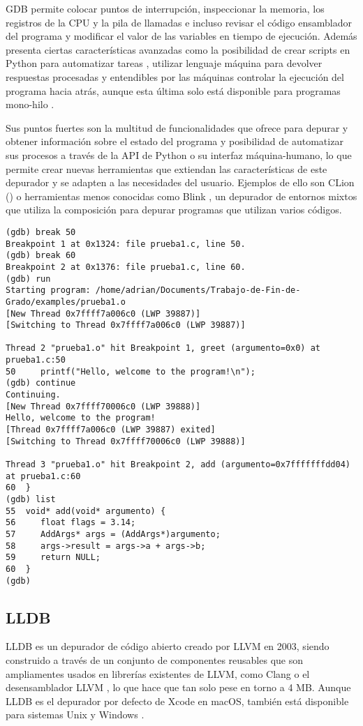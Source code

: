 GDB permite colocar puntos de interrupción, inspeccionar la memoria, los \gls{registros} de la \gls{CPU} y la pila de llamadas e incluso revisar el código \gls{ensamblador} del programa y modificar el valor de las variables en tiempo de ejecución. Además presenta ciertas características avanzadas como la posibilidad de crear \glspl{script} en Python para automatizar tareas \cite{GDBPython}, utilizar \gls{lenguaje máquina} para devolver respuestas procesadas y entendibles por las máquinas \cite{GDB/MI} controlar la ejecución del programa hacia atrás, aunque esta última solo está disponible para programas mono-hilo \cite{GDBReversing}.

Sus puntos fuertes son la multitud de funcionalidades que ofrece para \gls{depurar} y obtener información sobre el estado del programa y posibilidad de automatizar sus \glspl{proceso} a través de la \gls{API} de Python o su \gls{interfaz máquina-humano}, lo que permite crear nuevas herramientas que extiendan las características de este \gls{depurador} y se adapten a las necesidades del usuario. Ejemplos de ello son CLion () o herramientas menos conocidas como Blink \cite{Blink}, un \gls{depurador} de entornos mixtos que utiliza la composición para \gls{depurar} programas que utilizan varios códigos.

\begin{lstlisting}[caption={Muestra del depurador GDB}]
(gdb) break 50
Breakpoint 1 at 0x1324: file prueba1.c, line 50.
(gdb) break 60
Breakpoint 2 at 0x1376: file prueba1.c, line 60.
(gdb) run
Starting program: /home/adrian/Documents/Trabajo-de-Fin-de-Grado/examples/prueba1.o 
[New Thread 0x7ffff7a006c0 (LWP 39887)]
[Switching to Thread 0x7ffff7a006c0 (LWP 39887)]

Thread 2 "prueba1.o" hit Breakpoint 1, greet (argumento=0x0) at prueba1.c:50
50	   printf("Hello, welcome to the program!\n");
(gdb) continue
Continuing.
[New Thread 0x7ffff70006c0 (LWP 39888)]
Hello, welcome to the program!
[Thread 0x7ffff7a006c0 (LWP 39887) exited]
[Switching to Thread 0x7ffff70006c0 (LWP 39888)]

Thread 3 "prueba1.o" hit Breakpoint 2, add (argumento=0x7fffffffdd04) at prueba1.c:60
60	}
(gdb) list
55	void* add(void* argumento) {
56	   float flags = 3.14;
57	   AddArgs* args = (AddArgs*)argumento;
58	   args->result = args->a + args->b;
59	   return NULL;
60	}
(gdb) 
\end{lstlisting}

\subsection{LLDB}{\label{subsec:lldb}}
LLDB es un \gls{depurador} de \gls{código abierto} creado por LLVM en 2003, siendo construido a través de un conjunto de componentes reusables que son ampliamentes usados en librerías existentes de LLVM, como Clang o el \gls{desensamblador} LLVM \cite{LLDB}, lo que hace que tan solo pese en torno a 4 MB.
Aunque LLDB es el depurador por defecto de Xcode en macOS, también está disponible para sistemas Unix y Windows \cite{LLDB}.

